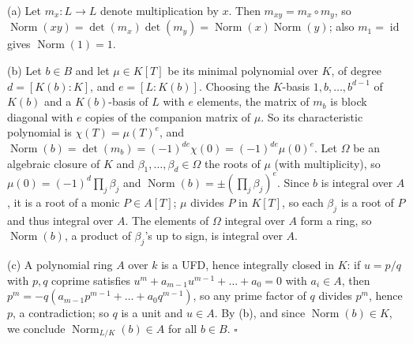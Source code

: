 \documentclass[11pt]{article}
\begin{document}
\pf
(a) Let $m_x:L\to L$ denote multiplication by $x$. Then $m_{xy}=m_x\circ m_y$, so $\operatorname{Norm}(xy)=\det(m_x)\det(m_y)=\operatorname{Norm}(x)\operatorname{Norm}(y)$; also $m_1=\operatorname{id}$ gives $\operatorname{Norm}(1)=1$.

(b) Let $b\in B$ and let $\mu\in K[T]$ be its minimal polynomial over $K$, of degree $d=[K(b):K]$, and $e=[L:K(b)]$. Choosing the $K$-basis $1,b,\dots,b^{d-1}$ of $K(b)$ and a $K(b)$-basis of $L$ with $e$ elements, the matrix of $m_b$ is block diagonal with $e$ copies of the companion matrix of $\mu$. So its characteristic polynomial is $\chi(T)=\mu(T)^e$, and $\operatorname{Norm}(b)=\det(m_b)=(-1)^{de}\chi(0)=(-1)^{de}\mu(0)^e$. Let $\Omega$ be an algebraic closure of $K$ and $\beta_1,\dots,\beta_d\in\Omega$ the roots of $\mu$ (with multiplicity), so $\mu(0)=(-1)^d\prod_j\beta_j$ and $\operatorname{Norm}(b)=\pm(\prod_j\beta_j)^e$. Since $b$ is integral over $A$, it is a root of a monic $P\in A[T]$; $\mu$ divides $P$ in $K[T]$, so each $\beta_j$ is a root of $P$ and thus integral over $A$. The elements of $\Omega$ integral over $A$ form a ring, so $\operatorname{Norm}(b)$, a product of $\beta_j$'s up to sign, is integral over $A$.

(c) A polynomial ring $A$ over $k$ is a UFD, hence integrally closed in $K$: if $u=p/q$ with $p,q$ coprime satisfies $u^m+a_{m-1}u^{m-1}+\dots+a_0=0$ with $a_i\in A$, then $p^m=-q(a_{m-1}p^{m-1}+\dots+a_0q^{m-1})$, so any prime factor of $q$ divides $p^m$, hence $p$, a contradiction; so $q$ is a unit and $u\in A$. By (b), and since $\operatorname{Norm}(b)\in K$, we conclude $\operatorname{Norm}_{L/K}(b)\in A$ for all $b\in B$. \hfill$\square$
\end{document}
